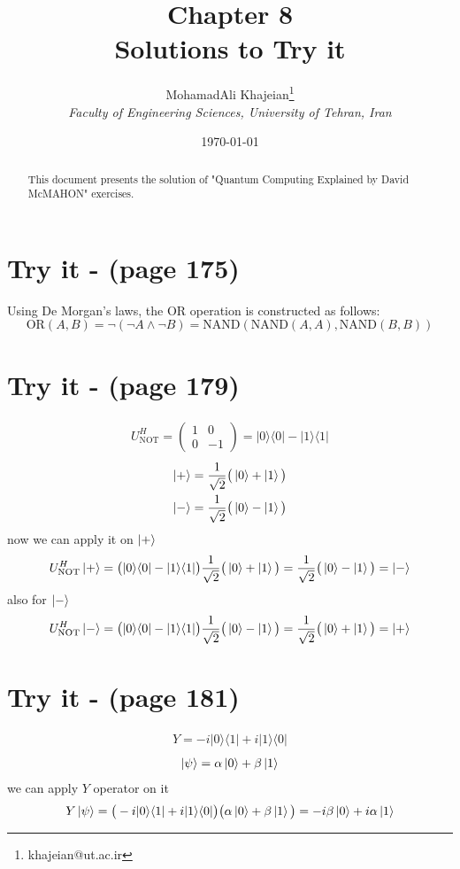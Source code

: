 \documentclass{article}
\title{\textbf{Chapter 8} \\ \small Solutions to Try it}
\author{
    MohamadAli Khajeian\footnote{khajeian@ut.ac.ir} \\ 
    \small \textit{Faculty of Engineering Sciences, University of Tehran, Iran} \\ 
}
\date{\today}
\newcommand{\op}[2]{|#1\rangle \langle#2|}
\begin{document}
\maketitle

\begin{abstract}
    This document presents the solution of "Quantum Computing Explained by David McMAHON" exercises.
\end{abstract}

\section*{Try it - (page 175)}
Using De Morgan's laws, the OR operation is constructed as follows:
\[
\text{OR}(A, B) = \neg(\neg A \land \neg B) = \text{NAND}(\text{NAND}(A, A), \text{NAND}(B, B))
\]
\section*{Try it - (page 179)}
\begin{align*}
   U^{H}_{\text{NOT}} = 
   \begin{pmatrix}
      1 & 0 \\
      0 & -1 
   \end{pmatrix} = 
   \op{0}{0} - \op{1}{1}
\end{align*}
\begin{align*}
   \ket{+} &= \frac{1}{\sqrt{2}}\big(\ket{0}+\ket{1}\big) \\
   \ket{-} &= \frac{1}{\sqrt{2}}\big(\ket{0}-\ket{1}\big)
\end{align*}
now we can apply it on $\ket{+}$
\begin{align*}
   U^{H}_{\text{NOT}} \ket{+} = \big(\op{0}{0} - \op{1}{1}\big)\frac{1}{\sqrt{2}}\big(\ket{0}+\ket{1}\big) = \frac{1}{\sqrt{2}}\big(\ket{0}-\ket{1}\big) = \ket{-}
\end{align*}
also for $\ket{-}$
\begin{align*}
   U^{H}_{\text{NOT}} \ket{-} = \big(\op{0}{0} - \op{1}{1}\big)\frac{1}{\sqrt{2}}\big(\ket{0}-\ket{1}\big) = \frac{1}{\sqrt{2}}\big(\ket{0}+\ket{1}\big) = \ket{+}
\end{align*}
\section*{Try it - (page 181)}
\begin{align*}
   Y = -i\op{0}{1} + i\op{1}{0}
\end{align*}
\begin{align*}
   \ket{\psi} = \alpha\ket{0} + \beta\ket{1}
\end{align*}
we can apply $Y$ operator on it
\begin{align*}
   Y\ket{\psi} = \big(-i\op{0}{1} + i\op{1}{0}\big)\big(\alpha\ket{0} + \beta\ket{1}\big) = -i\beta\ket{0} + i\alpha\ket{1}
\end{align*}
\end{document}
